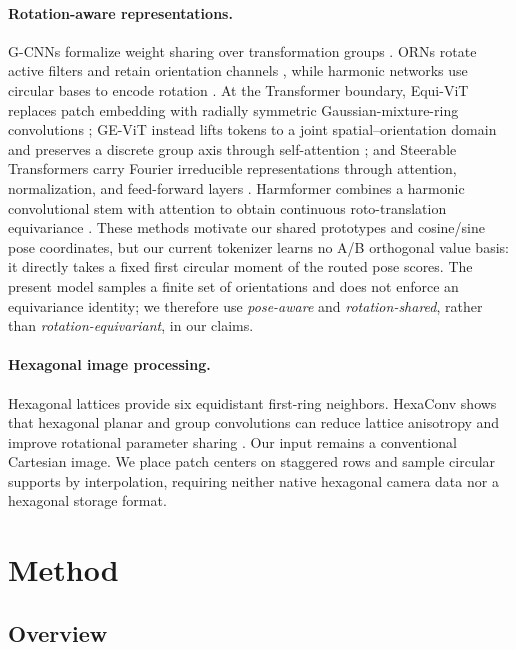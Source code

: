 \documentclass[10pt]{article}
\begin{document}
\paragraph{Rotation-aware representations.}
G-CNNs formalize weight sharing over transformation groups
\citep{cohen2016gcnn}. ORNs rotate active filters and retain orientation
channels \citep{zhou2017orn}, while harmonic networks use circular bases to
encode rotation \citep{worrall2017harmonic}. At the Transformer boundary,
Equi-ViT replaces patch embedding with radially symmetric Gaussian-mixture-ring
convolutions \citep{chen2026equivit}; GE-ViT instead lifts tokens to a joint
spatial--orientation domain and preserves a discrete group axis through
self-attention \citep{xu2023e2vit}; and Steerable Transformers carry Fourier
irreducible representations through attention, normalization, and feed-forward
layers \citep{kundu2025steerable}. Harmformer combines a harmonic convolutional
stem with attention to obtain continuous roto-translation equivariance
\citep{karella2024harmformer}. These methods motivate our shared prototypes
and cosine/sine pose coordinates, but our current tokenizer learns no A/B
orthogonal value basis: it directly takes a fixed first circular moment of the
routed pose scores. The present model samples a finite set of orientations and
does not enforce an equivariance identity; we therefore use \emph{pose-aware}
and \emph{rotation-shared}, rather than \emph{rotation-equivariant}, in our
claims.

\paragraph{Hexagonal image processing.}
Hexagonal lattices provide six equidistant first-ring neighbors. HexaConv shows
that hexagonal planar and group convolutions can reduce lattice anisotropy and
improve rotational parameter sharing \citep{hoogeboom2018hexaconv}. Our input
remains a conventional Cartesian image. We place patch centers on staggered
rows and sample circular supports by interpolation, requiring neither native
hexagonal camera data nor a hexagonal storage format.

\section{Method}

\subsection{Overview}
\end{document}
